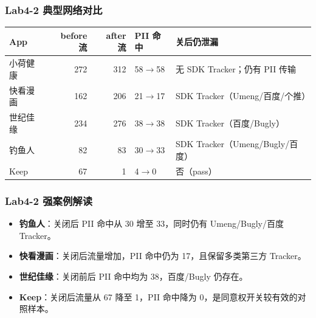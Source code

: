 \documentclass[AutoFakeBold,AutoFakeSlant]{beamer}
\begin{document}
\begin{frame}
    \frametitle{Lab4-2 典型网络对比}
    \scriptsize
    \begin{tabularx}{\textwidth}{|l|r|r|l|X|}
        \toprule
        \textbf{App} & \textbf{before 流} & \textbf{after 流} & \textbf{PII 命中} & \textbf{关后仍泄漏} \\
        \midrule
        小荷健康 & 272 & 312 & 58$\rightarrow$58 & 无 SDK Tracker；仍有 PII 传输 \\
        \hline
        快看漫画 & 162 & 206 & 21$\rightarrow$17 & SDK Tracker（Umeng/百度/个推） \\
        \hline
        世纪佳缘 & 234 & 276 & 38$\rightarrow$38 & SDK Tracker（百度/Bugly） \\
        \hline
        钓鱼人 & 82 & 83 & 30$\rightarrow$33 & SDK Tracker（Umeng/Bugly/百度） \\
        \hline
        Keep & 67 & 1 & 4$\rightarrow$0 & 否（pass） \\
        \bottomrule
    \end{tabularx}
\end{frame}

\begin{frame}
    \frametitle{Lab4-2 强案例解读}
    \small
    \begin{itemize}
        \item \textbf{钓鱼人}：关闭后 PII 命中从 30 增至 33，同时仍有 Umeng/Bugly/百度 Tracker。
        \item \textbf{快看漫画}：关闭后流量增加，PII 命中仍为 17，且保留多类第三方 Tracker。
        \item \textbf{世纪佳缘}：关闭前后 PII 命中均为 38，百度/Bugly 仍存在。
        \item \textbf{Keep}：关闭后流量从 67 降至 1，PII 命中降为 0，是同意权开关较有效的对照样本。
    \end{itemize}
\end{frame}
\end{document}
